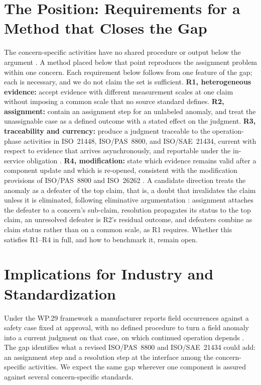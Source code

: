 \documentclass[conference,a4paper]{IEEEtran}
\begin{document}
	\section{The Position: Requirements for a Method that Closes the Gap}
	The concern-specific activities have no shared procedure or output below the argument \cite{PatelJungWAISE2026}. A method placed below that point reproduces the assignment problem within one concern. Each requirement below follows from one feature of the gap; each is necessary, and we do not claim the set is sufficient. \textbf{R1, heterogeneous evidence:} accept evidence with different measurement scales at one claim without imposing a common scale that no source standard defines. \textbf{R2, assignment:} contain an assignment step for an unlabeled anomaly, and treat the unassignable case as a defined outcome with a stated effect on the judgment. \textbf{R3, traceability and currency:} produce a judgment traceable to the operation-phase activities in ISO~21448, ISO/PAS~8800, and ISO/SAE~21434, current with respect to evidence that arrives asynchronously, and reportable under the in-service obligation \cite{UNECE2026}. \textbf{R4, modification:} state which evidence remains valid after a component update and which is re-opened, consistent with the modification provisions of ISO/PAS~8800 and ISO~26262 \cite{ISO26262}. A candidate direction treats the anomaly as a defeater of the top claim, that is, a doubt that invalidates the claim unless it is eliminated, following eliminative argumentation \cite{Bloomfield2024}: assignment attaches the defeater to a concern's sub-claim, resolution propagates its status to the top claim, an unresolved defeater is R2's residual outcome, and defeaters combine as claim status rather than on a common scale, as R1 requires. Whether this satisfies R1--R4 in full, and how to benchmark it, remain open.
	
	\section{Implications for Industry and Standardization}
	Under the WP.29 framework a manufacturer reports field occurrences against a safety case fixed at approval, with no defined procedure to turn a field anomaly into a current judgment on that case, on which continued operation depends \cite{UNECE2026}. The gap identifies what a revised ISO/PAS~8800 and ISO/SAE~21434 could add: an assignment step and a resolution step at the interface among the concern-specific activities. We expect the same gap wherever one component is assured against several concern-specific standards.
	
\end{document}

